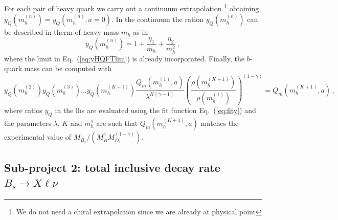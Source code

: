 For each pair of heavy quark we carry out a continuum extrapolation
\footnote{We do not need a chiral extrapolation since we are already at physical point}
obtaining $y_Q( m^{(n)}_h)=y_Q( m^{(n)}_h,a=0)$.
In the continuum the ration $y_Q( m^{(n)}_h)$ can be described in therm
of heavy mass $ m_h$ as in \cite{ETM:2011zey}
\begin{equation}
  y_Q( m^{(n)}_h) = 1 + \frac{\eta_1}{ m_h}+ \frac{\eta_2}{ m_h^2}\,,
  \label{eq:fity}
\end{equation}
where the limit in Eq.~(\ref{eq:yHQFTlim}) is already incorporated.
Finally, the $b$-quark mass can be computed with
\begin{equation}
  y_Q( m^{(2)}_h)y_Q( m^{(3)}_h)...y_Q( m^{(K+1)}_h)\frac{Q_m( m_h^{(1)},a)}{\lambda^{K(\gamma-1)}}
  \left(\frac{ \rho( m_{h}^{(K+1)})}{\rho( m_{h}^{(1)})}\right)^{(1-\gamma)}=Q_m( m_h^{(K+1)},a)
  \,,
\end{equation}
where  ratios $y_Q$  in the lhs are evaluated using the fit function Eq.~(\ref{eq:fity})
and the parameters $\lambda$, $K$ and $ m_h^1$ are such that $Q_m( m_h^{(K+1)},a)$ matches
the experimental value of $M_{B_s}/(M_{B}^\gamma M_{D_s}^{(1-\gamma)})$.



\subsection{Sub-project 2: total inclusive decay rate $B_s \to X\ell\nu$}

